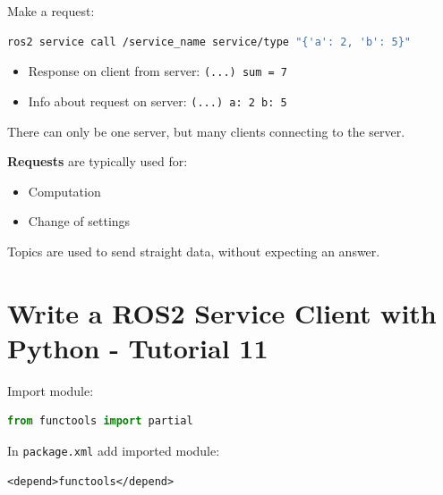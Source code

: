 \documentclass{article}
\newcommand{\code}[1]{\colorbox{codeBg}{\texttt{#1}}}
\begin{document}
\vspace{0.3cm}
\noindent Make a request:
\begin{lstlisting}[style=bashStyle, language=bash]
ros2 service call /service_name service/type "{'a': 2, 'b': 5}"
\end{lstlisting}
\begin{itemize}
    \item Response on client from server: \code{(...) sum = 7}
    \item Info about request on server: \code{(...) a: 2 b: 5}
\end{itemize}

\vspace{0.5cm}
\begin{warnbox}
There can only be one server, but many clients connecting to the server.
\end{warnbox}

\vspace{0.3cm}
\noindent \textbf{Requests} are typically used for:
\begin{itemize}
    \item Computation
    \item Change of settings
\end{itemize}

\vspace{0.3cm}
\begin{notebox}
Topics are used to send straight data, without expecting an answer.
\end{notebox}

\newpage

\section{Write a ROS2 Service Client with Python - Tutorial 11}

\vspace{0.3cm}
\noindent Import module:
\begin{lstlisting}[style=pythonStyle, language=Python]
from functools import partial
\end{lstlisting}

\vspace{0.3cm}
\noindent In \code{package.xml} add imported module:
\begin{lstlisting}[style=xmlStyle]
<depend>functools</depend>
\end{lstlisting}
\end{document}
